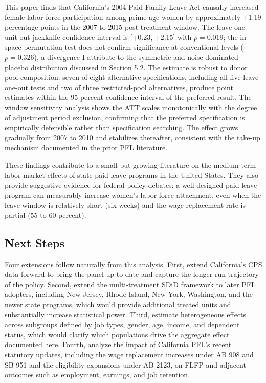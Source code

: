 \documentclass[12pt, letterpaper]{article}
\begin{document}
This paper finds that California's 2004 Paid Family Leave Act causally increased female labor force participation among prime-age women by approximately +1.19 percentage points in the 2007 to 2015 post-treatment window. The leave-one-unit-out jackknife confidence interval is [+0.23, +2.15] with $p = 0.019$; the in-space permutation test does not confirm significance at conventional levels ($p = 0.326$), a divergence I attribute to the symmetric and noise-dominated placebo distribution discussed in Section 5.2. The estimate is robust to donor pool composition: seven of eight alternative specifications, including all five leave-one-out tests and two of three restricted-pool alternatives, produce point 
estimates within the 95 percent confidence interval of the preferred result. The window sensitivity analysis shows the ATT scales monotonically with the degree of adjustment period exclusion, confirming that the preferred specification is empirically defensible rather than specification searching. The effect grows gradually from 2007 to 2010 and stabilizes thereafter, consistent with the take-up mechanism documented in the prior PFL literature.

These findings contribute to a small but growing literature on the medium-term labor market effects of state paid leave programs in the United States. They also provide suggestive evidence for federal policy debates: a well-designed paid leave program can measurably increase women's labor force attachment, even when the leave window is relatively short (six weeks) and the wage replacement rate is partial (55 to 60 percent).

\subsection{Next Steps}

Four extensions follow naturally from this analysis. First, extend California's CPS data forward to bring the panel up to date and capture the longer-run trajectory of the policy. Second, extend the multi-treatment SDiD framework to later PFL adopters, including New Jersey, Rhode Island, New York, Washington, and the newer state programs, which would provide additional treated units and substantially increase statistical power. Third, estimate heterogeneous effects across subgroups defined by job types, gender, age, income, and dependent status, which would clarify which populations drive the aggregate effect documented here. Fourth, analyze the impact of California PFL's recent statutory updates, including the wage replacement increases under AB 908 and SB 951 and the eligibility expansions under AB 2123, on FLFP and adjacent outcomes such as employment, earnings, and job retention.
\end{document}
